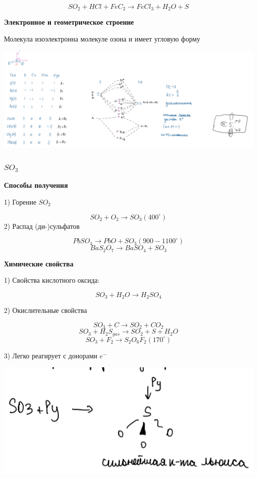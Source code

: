 \documentclass[14pt,a4paper]{scrartcl}
\begin{document}
$$SO_2 + HCl + FeC_2 \rightarrow FeCl_3 + H_2O + S$$

\textbf{Электронное и геометрическое строение}

Молекула изоэлектронна молекуле озона и имеет угловую форму

\includegraphics[scale=0.9]{7v1.png}

\subsubsection{$SO_3$}

\textbf{Способы получения}

1) Горение $SO_2$

$$SO_2 + O_2 \rightarrow SO_3 (400^{\circ})$$
2) Распад (ди-)сульфатов

$$PbSO_4 \rightarrow PbO + SO_3 (900-1100^{\circ})$$
$$BaS_2O_7 \rightarrow BaSO_4 + SO_3$$

\textbf{Химические свойства}

1) Свойства кислотного оксида:

$$SO_3 + H_2O \rightarrow H_2SO_4$$

2) Окислительные свойства 

$$SO_3 + C \rightarrow SO_2 + CO_2$$
$$SO_3 + H_2S_{gas} \rightarrow SO_2 +S + H_2O$$
$$SO_3 + F_2 \rightarrow S_2O_6F_2(170^{\circ})$$

3) Легко реагирует с донорами $e^-$

\includegraphics{7v2.png}
\end{document}
